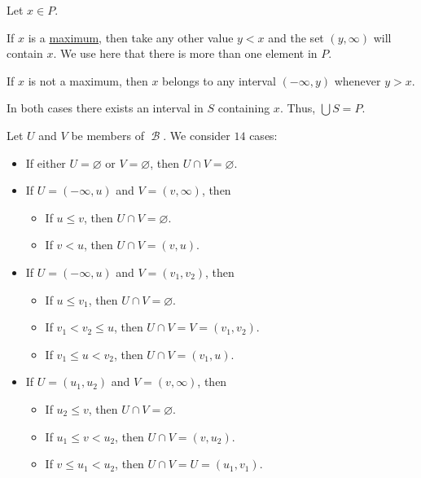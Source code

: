 \begin{defproof}
   Let \( x \in P \).

  If \( x \) is a \hyperref[def:extremal_points/maximum_and_minimum]{maximum}, then take any other value \( y < x \) and the set \( (y, \infty) \) will contain \( x \). We use here that there is more than one element in \( P \).

  If \( x \) is not a maximum, then \( x \) belongs to any interval \( (-\infty, y) \) whenever \( y > x \).

  In both cases there exists an interval in \( S \) containing \( x \). Thus, \( \bigcup S = P \).

   Let \( U \) and \( V \) be members of \( \mscrB \). We consider \( 14 \) cases:
  \begin{itemize}
    \item If either \( U = \varnothing \) or \( V = \varnothing \), then \( U \cap V = \varnothing \).
    \item If \( U = (-\infty, u) \) and \( V = (v, \infty) \), then
    \begin{itemize}
      \item If \( u \leq v \), then \( U \cap V = \varnothing \).
      \item If \( v < u \), then \( U \cap V = (v, u) \).
    \end{itemize}

    \item If \( U = (-\infty, u) \) and \( V = (v_1, v_2) \), then
    \begin{itemize}
      \item If \( u \leq v_1 \), then \( U \cap V = \varnothing \).
      \item If \( v_1 < v_2 \leq u \), then \( U \cap V = V =  (v_1, v_2) \).
      \item If \( v_1 \leq u < v_2 \), then \( U \cap V = (v_1, u) \).
    \end{itemize}

    \item If \( U = (u_1, u_2) \) and \( V = (v, \infty) \), then
    \begin{itemize}
      \item If \( u_2 \leq v \), then \( U \cap V = \varnothing \).
      \item If \( u_1 \leq v < u_2 \), then \( U \cap V = (v, u_2) \).
      \item If \( v \leq u_1 < u_2 \), then \( U \cap V = U = (u_1, v_1) \).
    \end{itemize}


\end{itemize}
\end{defproof}
